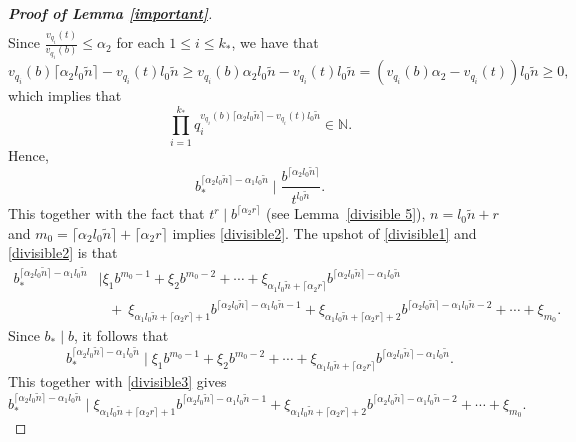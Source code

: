 \documentclass[12pt]{article}
\theoremstyle{definition}
\theoremstyle{remark}
\begin{document}
\begin{proof}[\rm \textbf{Proof of Lemma \ref{important}}]
\begin{equation*}
\begin{aligned}
\end{aligned}
\end{equation*}
Since $\frac{v_{q_{i}}(t)}{v_{q_{i}}(b)}\leq \alpha_{2}$ for each $1\leq i\leq k_{*}$, we have that 
$$v_{q_{i}}(b)\lceil\alpha_{2}l_{0}\tilde{n}\rceil-v_{q_{i}}(t)l_{0}\tilde{n}\geq v_{q_{i}}(b)\alpha_{2}l_{0}\tilde{n}-v_{q_{i}}(t)l_{0}\tilde{n}=(v_{q_{i}}(b)\alpha_{2}-v_{q_{i}}(t))l_{0}\tilde{n}\geq 0,$$
which implies that 
$$\prod_{i=1}^{k_{*}}q_{i}^{v_{q_{i}}(b)\lceil\alpha_{2}l_{0}\tilde{n}\rceil-v_{q_{i}}(t)l_{0}\tilde{n}}\in\mathbb{N}.$$
Hence,
$$b_{*}^{\lceil\alpha_{2}l_{0}\tilde{n}\rceil-\alpha_{1}l_{0}\tilde{n}}\mid\frac{b^{\lceil\alpha_{2}l_{0}\tilde{n}\rceil}}{t^{l_{0}\tilde{n}}}.$$
This together with the fact that $t^{r}\mid b^{\lceil\alpha_{2}r\rceil}$ (see Lemma~\ref{divisible 5}), $n=l_{0}\tilde{n}+r$ and $m_{0}=\lceil\alpha_{2}l_{0}\tilde{n}\rceil+\lceil\alpha_{2}r\rceil$ implies  \eqref{divisible2}. The upshot of \eqref{divisible1} and \eqref{divisible2} is that
\begin{equation}\label{divisible3}
\begin{aligned}
b_{*}^{\lceil\alpha_{2}l_{0}\tilde{n}\rceil-\alpha_{1}l_{0}\tilde{n}}&\mid\xi_{1}b^{m_{0}-1}+\xi_{2}b^{m_{0}-2} +\cdots+\xi_{\alpha_{1}l_{0}\tilde{n}+\lceil\alpha_{2} r\rceil}b^{\lceil\alpha_{2}l_{0}\tilde{n}\rceil-\alpha_{1}l_{0}\tilde{n}} \\[2ex]
& \ \ \ +   \ \xi_{\alpha_{1}l_{0}\tilde{n}+\lceil\alpha_{2} r\rceil+1}b^{\lceil\alpha_{2}l_{0}\tilde{n}\rceil-\alpha_{1}l_{0}\tilde{n}-1}+  \xi_{\alpha_{1}l_{0}\tilde{n}+\lceil\alpha_{2} r\rceil+2}b^{\lceil\alpha_{2}l_{0}\tilde{n}\rceil-\alpha_{1}l_{0}\tilde{n}-2}+\cdots+\xi_{m_{0}}.
\end{aligned}
\end{equation}
Since $b_{*}\mid b$, it follows that
$$b_{*}^{\lceil\alpha_{2}l_{0}\tilde{n}\rceil-\alpha_{1}l_{0}\tilde{n}}\mid\xi_{1}b^{m_{0}-1}+\xi_{2}b^{m_{0}-2} +\cdots+\xi_{\alpha_{1}l_{0}\tilde{n}+\lceil\alpha_{2} r\rceil}b^{\lceil\alpha_{2}l_{0}\tilde{n}\rceil-\alpha_{1}l_{0}\tilde{n}} .$$
This together with \eqref{divisible3} gives 
\begin{equation}  \label{10Jan}
b_{*}^{\lceil\alpha_{2}l_{0}\tilde{n}\rceil-\alpha_{1}l_{0}\tilde{n}}\mid\xi_{\alpha_{1}l_{0}\tilde{n}+\lceil\alpha_{2} r\rceil+1}b^{\lceil\alpha_{2}l_{0}\tilde{n}\rceil-\alpha_{1}l_{0}\tilde{n}-1}+  \xi_{\alpha_{1}l_{0}\tilde{n}+\lceil\alpha_{2} r\rceil+2}b^{\lceil\alpha_{2}l_{0}\tilde{n}\rceil-\alpha_{1}l_{0}\tilde{n}-2}+\cdots+\xi_{m_{0}} .
\end{equation}

\end{proof}
\end{document}
